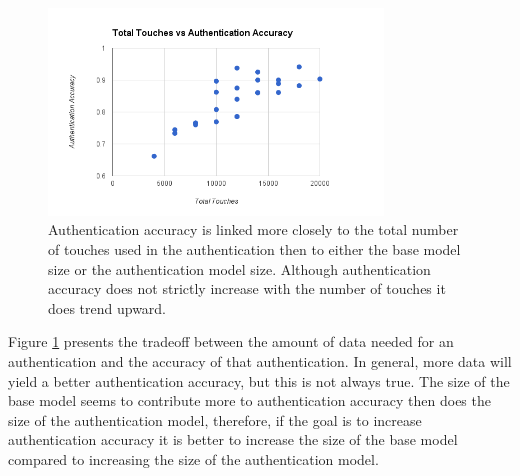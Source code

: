 \documentclass{acm_proc_article-sp}
\begin{document}
\begin{figure}
\centering
\includegraphics[width=3.5in]{total_touches_vs_authentication_accuracy.png}
\caption{Authentication accuracy is linked more closely to the total number of touches used in the authentication then to either the base model size or the authentication model size. Although authentication accuracy does not strictly increase with the number of touches it does trend upward.}
\label{fig:total_touches_vs_authentication_accuracy}
\end{figure}

%
Figure \ref{fig:total_touches_vs_authentication_accuracy} presents the tradeoff between the amount of data needed for an authentication and the accuracy of that authentication.
In general, more data will yield a better authentication accuracy, but this is not always true.
The size of the base model seems to contribute more to authentication accuracy then does the size of the authentication model, therefore, if the goal is to increase authentication accuracy it is better to increase the size of the base model compared to increasing the size of the authentication model.



%
\end{document}
